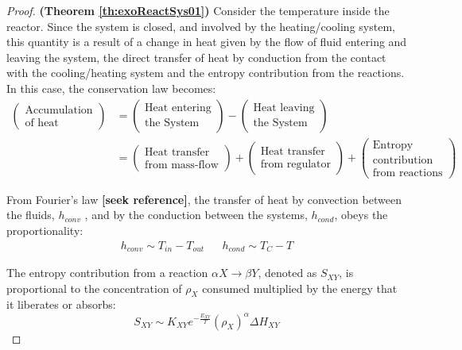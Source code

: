\documentclass[a4paper,11pt]{book}
\numberwithin{figure}{chapter}
\numberwithin{equation}{chapter}
\numberwithin{table}{chapter}
\theoremstyle{definition}
\begin{document}
\begin{proof}{\textbf{(Theorem \ref{th:exoReactSys01})}}
	Consider the temperature inside the reactor. Since the system is closed, and involved by the heating/cooling system, this quantity is a result of a change in heat given by the flow of fluid entering and leaving the system, the direct transfer of heat by conduction from the contact with the cooling/heating system and the entropy contribution from the reactions. In this case, the conservation law becomes:	
	\begin{equation}
	\begin{split}
		\begin{pmatrix}
			\text{Accumulation} \\ \text{of heat}
		\end{pmatrix} &= \begin{pmatrix}
			\text{Heat entering} \\ \text{the System}
		\end{pmatrix} - \begin{pmatrix}
			\text{Heat leaving} \\ \text{the System}
		\end{pmatrix} \\
		 &= \begin{pmatrix}
			\text{Heat transfer} \\ \text{from mass-flow}
		\end{pmatrix} + \begin{pmatrix}
			\text{Heat transfer} \\ \text{from regulator}
		\end{pmatrix} + \begin{pmatrix}
			\text{Entropy} \\ \text{contribution} \\ \text{from reactions}
		\end{pmatrix}
	\end{split}
	\end{equation}
	
	From Fourier's law \textbf{[seek reference]}, the transfer of heat by convection between the fluids, $h_{conv}$ , and by the conduction between the systems, $h_{cond}$, obeys the proportionality:
	\begin{equation}
		\begin{matrix}
			h_{conv} \sim T_{in} - T_{out} & & h_{cond} \sim T_C - T
		\end{matrix}
	\end{equation}	 	
	
	The entropy contribution from a reaction $\alpha X \rightarrow \beta Y$, denoted as $S_{XY}$, is proportional to the concentration of $\rho_X$ consumed multiplied by the energy that it liberates or absorbs:
	\begin{equation}
		S_{XY} \sim K_{XY} e^{-\frac{E_{XY}}{T}} (\rho_X)^{\alpha} \Delta H_{XY}
	\end{equation}


\end{proof}
\end{document}
